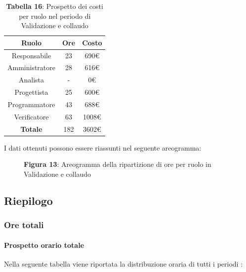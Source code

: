 \begin{table}[H]
	\centering
	\renewcommand{\arraystretch}{1.5}
	\begin{tabular}{|c|c|c|}
		\hline
		\rowcolor{lighter-grayer}
Ruolo & Ore & Costo \\ \hline
Responsabile & 23 & 690\euro \\ \hline
Amministratore & 28 & 616\euro \\ \hline
Analista & - & 0\euro \\ \hline
Progettista & 25 & 600\euro \\ \hline
Programmatore & 43 & 688\euro \\ \hline
Verificatore & 63 & 1008\euro \\ \hline
\textbf{Totale} & 182 & 3602\euro \\ \hline
	\end{tabular}
\caption*{\textbf{Tabella 16}: Prospetto dei costi per ruolo nel periodo di Validazione e collaudo\\}
\end{table}

I dati ottenuti possono essere riassunti nel seguente areogramma:


\begin{figure}[H]
	\centering
	\caption*{\textbf{Figura 13}: Areogramma della ripartizione di ore per ruolo in Validazione e collaudo}
	\label{fig:Figura10}
\end{figure}

\subsection{Riepilogo}
\subsubsection{Ore totali}
\paragraph{Prospetto orario totale}
Nella seguente tabella viene riportata la distribuzione oraria di tutti i periodi :

